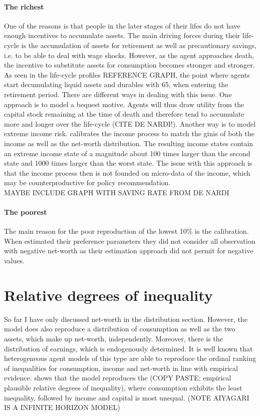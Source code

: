 \documentclass[a4paper,12pt]{article}
\begin{document}
\paragraph{The richest}
One of the reasons is that people in the later stages of their lifes do not have enough incentives to accumulate assets. The main driving forces during their life-cycle is the accumulation of assets for retirement as well as precautionary savings, i.e. to be able to deal with wage shocks. However, as the agent approaches death, the incentive to substitute assets for consumption becomes stronger and stronger. As seen in the life-cycle profiles REFERENCE GRAPH, the point where agents start decumulating liquid assets and durables with 65, when entering the retirement period. There are different ways in dealing with this issue. One approach is to model a bequest motive. Agents will thus draw utility from the capital stock remaining at the time of death and therefore tend to accumulate more and longer over the life-cycle (CITE DE NARDI!). Another way is to model extreme income risk. \citep{castaneda2003} calibrates the income process to match the ginis of both the income as well as the net-worth distribution. The resulting income states contain an extreme income state of a magnitude about 100 times larger than the second state and 1000 times larger than the worst state. The issue with this approach is that the income process then is not founded on micro-data of the income, which may be counterproductive for policy recommendation. 
\\
MAYBE INCLUDE GRAPH WITH SAVING RATE FROM DE NARDI
\\
\paragraph{The poorest}
The main reason for the poor reproduction of the lowest 10\% is the calibration. When \cite{hintermaier2011} estimated their preference parameters they did not consider all observation with negative net-worth as their estimation approach did not permit for negative values.

\section{Relative degrees of inequality}
So far I have only discussed net-worth in the distribution section. However, the model does also reproduce a distribution of consumption as well as the two assets, which make up net-worth, independently. Moreover, there is the distribution of earnings, which is endogenously determined. It is well known that heterogeneous agent models of this type are able to reproduce the ordinal ranking of inequalities for consumption, income and net-worth in line with empirical evidence.\cite{aiyagari1994} shows that the model reproduces the (COPY PASTE: empirical plausible relative degrees of inequality), where consumption exhibits the least inequality, followed by income and capital is most unequal. (NOTE AIYAGARI IS A INFINITE HORIZON MODEL) 
\end{document}
